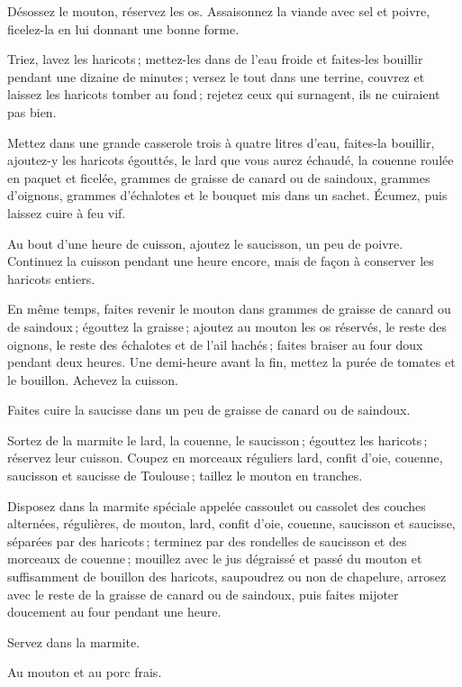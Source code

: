 Désossez le mouton, réservez les os. Assaisonnez la viande avec sel et poivre,
ficelez-la en lui donnant une bonne forme.

Triez, lavez les haricots ; mettez-les dans de l’eau froide et faites-les
bouillir pendant une dizaine de minutes ; versez le tout dans une terrine,
couvrez et laissez les haricots tomber au fond ; rejetez ceux qui surnagent,
ils ne cuiraient pas bien.

Mettez dans une grande casserole trois à quatre litres d’eau, faites-la
bouillir, ajoutez-y les haricots égouttés, le lard que vous aurez échaudé, la
couenne roulée en paquet et ficelée, {\mmm} grammes de graisse de canard
ou de saindoux, {\mmm} grammes d'oignons, {\mmm} grammes
d'échalotes et le bouquet mis dans un sachet. Écumez, puis laissez cuire à feu
vif.

Au bout d'une heure de cuisson, ajoutez le saucisson, un peu de poivre.
Continuez la cuisson pendant une heure encore, mais de façon à conserver les
haricots entiers.

En même temps, faites revenir le mouton dans {\mmm} grammes de graisse de
canard ou de saindoux ; égouttez la graisse ; ajoutez au mouton les os
réservés, le reste des oignons, le reste des échalotes et de l'ail hachés ;
faites braiser au four doux pendant deux heures. Une demi-heure avant la fin,
mettez la purée de tomates et le bouillon. Achevez la cuisson.

Faites cuire la saucisse dans un peu de graisse de canard ou de saindoux.

Sortez de la marmite le lard, la couenne, le saucisson ; égouttez les haricots ;
réservez leur cuisson. Coupez en morceaux réguliers lard, confit d'oie, couenne,
saucisson et saucisse de Toulouse ; taillez le mouton en tranches.

Disposez dans la marmite spéciale appelée cassoulet ou cassolet des couches
alternées, régulières, de mouton, lard, confit d'oie, couenne, saucisson et
saucisse, séparées par des haricots ; terminez par des rondelles de saucisson
et des morceaux de couenne ; mouillez avec le jus dégraissé et passé du mouton
et suffisamment de bouillon des haricots, saupoudrez ou non de chapelure,
arrosez avec le reste de la graisse de canard ou de saindoux, puis faites
mijoter doucement au four pendant une heure.

Servez dans la marmite.

\sk

Au mouton et au porc frais.

